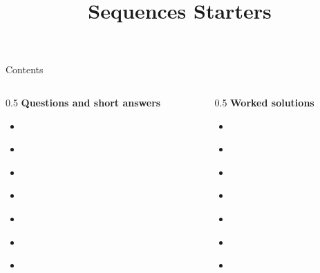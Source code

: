 \documentclass{beamer}
\title{Sequences Starters}
\date{}
\begin{document}

\frame{\titlepage}

\begin{frame}{Contents}
\small
\begin{columns}[T]
\begin{column}{0.5\textwidth}
\textbf{Questions and short answers}
\begin{itemize}
\item \hyperlink{q-st1}{}
\item \hyperlink{q-st2}{}
\item \hyperlink{q-st3}{}
\item \hyperlink{q-st4}{}
\item \hyperlink{q-st5}{}
\item \hyperlink{q-st6}{}
\item \hyperlink{q-st7}{}
\end{itemize}
\end{column}
\begin{column}{0.5\textwidth}
\textbf{Worked solutions}
\begin{itemize}
\item \hyperlink{work-st1}{}
\item \hyperlink{work-st2}{}
\item \hyperlink{work-st3}{}
\item \hyperlink{work-st4}{}
\item \hyperlink{work-st5}{}
\item \hyperlink{work-st6}{}
\item \hyperlink{work-st7}{}
\end{itemize}
\end{column}
\end{columns}
\end{frame}
\end{document}
